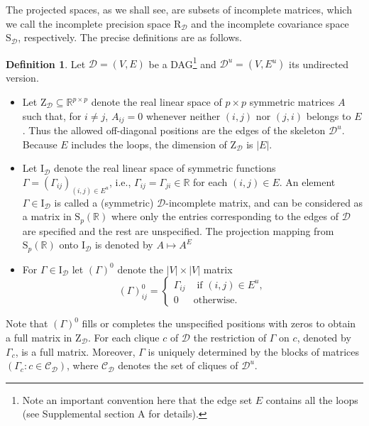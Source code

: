 \documentclass[12pt]{article}
\newcommand{\R}{\mathbb{R}}
\newcommand{\D}{\mathcal{D}}
\newcommand{\Rd}{\mathrm{R}_{\D}}
\newcommand{\Sd}{\mathrm{S}_{\D}}
\theoremstyle{plain}
\theoremstyle{definition}
\newtheorem{definition}[theorem]{Definition}
\theoremstyle{remark}
\begin{document}
  The projected spaces, as we shall see, are subsets of incomplete matrices, which we call  the incomplete precision  space $\Rd$ and the incomplete covariance space $\Sd$, respectively. The precise definitions are as follows.
 \begin{definition}\label{def:incomplete} Let $\D=(V, E)$ be a DAG\footnote{Note an important convention here that the edge set $E$ contains all the loops (see Supplemental section A for details).} and $\D^{u}=(V, E^{u})$ its undirected version.
  \begin{itemize}
  \renewcommand{\labelitemi}{$(a)$}
  \item Let $\mathrm{Z}_{\D}\subseteq \R^{p\times p}$ denote the real
  linear space of $p\times p$ symmetric matrices $A$ such that, for
  $i\ne j$, $A_{ij}=0$ whenever neither $(i,j)$ nor $(j,i)$ belongs to
  $E$.  Thus the allowed off-diagonal positions are the edges of the
  skeleton $\D^u$.  Because $E$ includes the loops, the dimension of
  $\mathrm{Z}_{\D}$ is $|E|$.
  \renewcommand{\labelitemi}{$(b)$}
  \item Let $\mathrm{I}_{\D}$ denote the real linear space of  symmetric functions $\Gamma=\left(\Gamma_{ij}\right)_{(i,j)\in E^{u}}$, i.e., $\Gamma_{ij}=\Gamma_{ji}\in\R$ for each $(i,j)\in E$. An element $\Gamma\in \mathrm{I}_{\D}$  is called a (symmetric) $\D$-incomplete matrix, and can be considered as a matrix in $\mathrm{S}_{p}(\R)$ where only the entries corresponding to the edges of $\D$ are specified and the rest are unspecified. The projection mapping from $\mathrm{S}_{p}(\R)$ onto $\mathrm{I}_{\D}$ is denoted by $A\mapsto A^E$ 
  \renewcommand{\labelitemi}{$(c)$}
  \item For $\Gamma\in\mathrm{I}_{\D}$ let $\left(\Gamma\right)^0$ denote the $|V|\times |V|$ matrix
  \[
  \left(\Gamma\right)^0_{ij}=\begin{cases} \Gamma_{ij}& \text{ if $(i,j)\in E^{u}$},\\ 0& \text{otherwise.}\end{cases}
  \]
  \end{itemize}
    \noindent Note that $\left(\Gamma\right)^0$ fills or completes the unspecified positions with zeros to obtain a full matrix in $\mathrm{Z}_{\D}$. For each clique $c$ of  $\D$  the restriction of  $\Gamma$  on $c$, denoted by $\Gamma_c$,  is a full matrix. Moreover, $\Gamma$ is uniquely determined by the blocks of matrices $(\Gamma_c:   c\in \mathscr{C}_{\D})$, where $\mathscr{C}_{\D}$ denotes the set of cliques of $\D^u$.
    \begin{itemize}

\end{itemize}
\end{definition}
\end{document}
